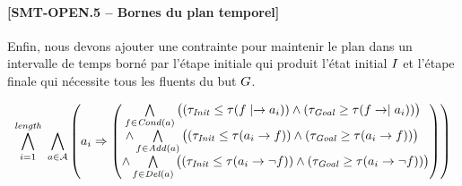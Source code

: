 \paragraph*{[SMT-OPEN.5 -- Bornes du plan temporel]}
Enfin, nous devons ajouter une contrainte pour maintenir le plan dans un intervalle de temps borné par l'étape initiale qui produit l'état initial $I$ et l'étape finale qui nécessite tous les fluents du but $G$.
\begin{small}
\[
\BigforallTwo{i=1}{\length}~\Bigforall{\substack{\a\in \A}}%
\left(\a_{i} \Rightarrow \begin{pmatrix}\Bigforall{\substack{\f\in \cond{\a}}} \begin{pmatrix}\left(\tau_{\mathit{Init}} \leq \tau(\f\mid\rightarrow\a_{i}) \right)%
 \wedge \left(\tau_{\mathit{Goal}} \geq \tau(\f\rightarrow\mid\a_{i})\right) \end{pmatrix}\hfill\\
 \wedge \Bigforall{\substack{\f\in \add{\a}}} \begin{pmatrix}\left(\tau_{\mathit{Init}} \leq \tau(\a_{i}\rightarrow \f) \right)%
 \wedge \left(\tau_{\mathit{Goal}} \geq \tau(\a_{i}\rightarrow \f)\right) \end{pmatrix}\hfill\\
 \wedge \Bigforall{\substack{\f\in \del{\a}}} \begin{pmatrix}\left(\tau_{\mathit{Init}} \leq \tau(\a_{i}\rightarrow \neg \f) \right)%
 \wedge \left(\tau_{\mathit{Goal}} \geq \tau(\a_{i}\rightarrow \neg \f)\right) \end{pmatrix} \end{pmatrix}\right)%
\]
\end{small}


